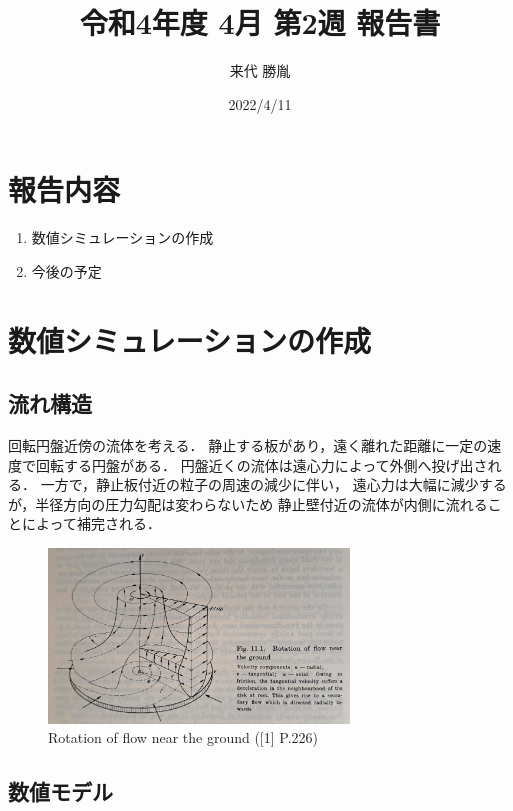 \documentclass[twocolumn,a4j]{jsarticle}
\author{来代 勝胤}
\title{令和4年度 4月 第2週 報告書}
\date{2022/4/11}
\begin{document}
\columnseprule=0.1mm
\maketitle

\section*{報告内容}
\begin{enumerate}[1.]
  \item 数値シミュレーションの作成
  \item 今後の予定
\end{enumerate}

\section{数値シミュレーションの作成}

\subsection{流れ構造}
回転円盤近傍の流体を考える．
静止する板があり，遠く離れた距離に一定の速度で回転する円盤がある．
円盤近くの流体は遠心力によって外側へ投げ出される．
一方で，静止板付近の粒子の周速の減少に伴い，
遠心力は大幅に減少するが，半径方向の圧力勾配は変わらないため
静止壁付近の流体が内側に流れることによって補完される．

\begin{figure}[htbp]
  \footnotesize
  \begin{center}
    \includegraphics[width=80mm]{../images/Boundary-Layer_Theory_Fig.11.1.jpg}
    \caption{Rotation of flow near the ground ([1] P.226)}
  \end{center}
\end{figure}

\subsection{数値モデル}
\end{document}
